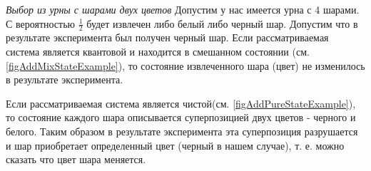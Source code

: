 \begin{example}
\emph{Выбор из урны с шарами двух цветов}
Допустим у нас имеется урна с 4 шарами. С вероятностью $\frac{1}{2}$
будет извлечен либо белый либо черный шар. Допустим что в результате
эксперимента был получен черный шар. Если рассматриваемая система
является квантовой и находится в смешанном состоянии 
(см. \autoref{figAddMixStateExample}), то состояние
извлеченного шара (цвет) не изменилось в результате эксперимента. 




Если рассматриваемая система является
чистой(см. \autoref{figAddPureStateExample}), то состояние каждого
шара описывается суперпозицией двух цветов - черного и белого. Таким
образом в результате эксперимента эта суперпозиция разрушается и шар
приобретает определенный цвет (черный в нашем случае), т. е. можно
сказать что цвет шара меняется.
\end{example}
